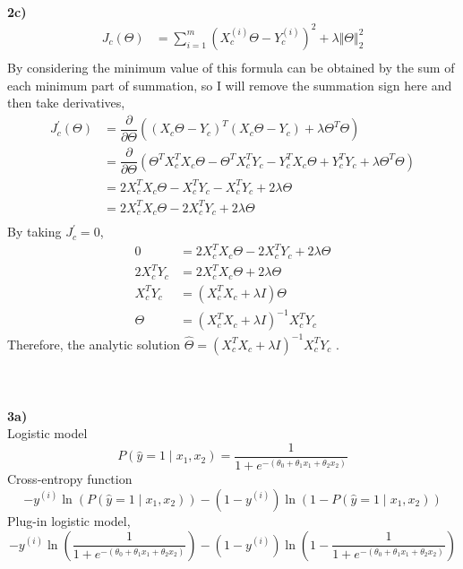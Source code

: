 \documentclass[12pt]{article}
\begin{document}
\paragraph{\\}
\textbf{2c)}\\
\begin{align*}
J_{c}(\Theta) &= \sum_{i=1}^{m}(X_{c}^{(i)}\Theta - Y^{(i)}_{c})^{2} + \lambda\Vert\Theta\Vert_{2}^{2}\\
\end{align*}
By considering the minimum value of this formula can be obtained by the sum of each minimum part of summation, so I will remove the summation sign here and then take derivatives,
\begin{align*}
J_{c}^{'}(\Theta) &= \dfrac{\partial}{\partial\Theta}((X_{c}\Theta - Y_{c})^{T}(X_{c}\Theta - Y_{c}) + \lambda\Theta^{T}\Theta)\\
&= \dfrac{\partial}{\partial\Theta}( \Theta^{T}X_{c}^{T}X_{c}\Theta - \Theta^{T}X_{c}^{T}Y_{c} - Y_{c}^{T}X_{c}\Theta + Y_{c}^{T}Y_{c} + \lambda\Theta^{T}\Theta)\\
&= 2X_{c}^{T}X_{c}\Theta - X_{c}^{T}Y_{c} - X_{c}^{T}Y_{c} + 2\lambda\Theta\\
&= 2X_{c}^{T}X_{c}\Theta - 2X_{c}^{T}Y_{c} + 2\lambda\Theta\\
\end{align*}
By taking $J_{c}^{'} = 0$,\\
\begin{align*}
0 &= 2X_{c}^{T}X_{c}\Theta - 2X_{c}^{T}Y_{c} + 2\lambda\Theta\\
2X_{c}^{T}Y_{c} &= 2X_{c}^{T}X_{c}\Theta + 2\lambda\Theta\\
X_{c}^{T}Y_{c} &= (X_{c}^{T}X_{c}+ \lambda I)\Theta\\
\Theta &= (X_{c}^{T}X_{c}+ \lambda I)^{-1}X_{c}^{T}Y_{c}
\end{align*}
Therefore, the analytic solution $\hat{\Theta} = (X_{c}^{T}X_{c}+ \lambda I)^{-1}X_{c}^{T}Y_{c}$ .\paragraph{\\}
\newpage
\textbf{3a)}\\ 
Logistic model
\[ P(\hat{y} = 1\mid x_{1}, x_{2}) = \frac{1}{1+e^{-(\theta_{0}+\theta_{1}x_{1}+\theta_{2}x_{2})}}\]
Cross-entropy function
\[-y^{(i)}\ln(P(\hat{y} = 1\mid x_{1}, x_{2})) - (1-y^{(i)})\ln(1-P(\hat{y} = 1\mid x_{1}, x_{2}))\]
Plug-in logistic model,
\[-y^{(i)}\ln(\frac{1}{1+e^{-(\theta_{0}+\theta_{1}x_{1}+\theta_{2}x_{2})}}) - (1-y^{(i)})\ln(1-\frac{1}{1+e^{-(\theta_{0}+\theta_{1}x_{1}+\theta_{2}x_{2})}})\]
\end{document}
